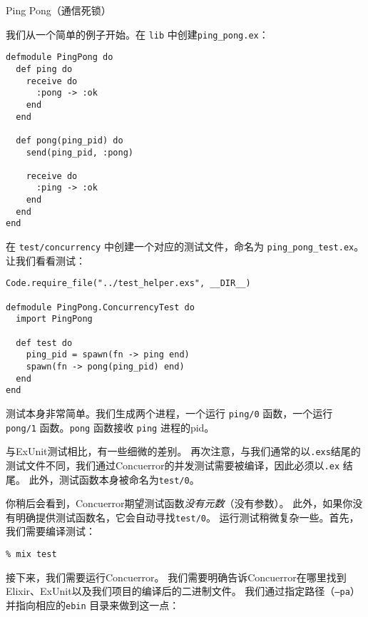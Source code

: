 \begin{example}{Ping Pong（通信死锁）}

我们从一个简单的例子开始。在 \texttt{lib} 中创建\texttt{ping\_pong.ex}：

\begin{code}{}
\begin{verbatim}
defmodule PingPong do
  def ping do
    receive do
      :pong -> :ok
    end
  end

  def pong(ping_pid) do
    send(ping_pid, :pong)

    receive do
      :ping -> :ok
    end
  end
end
\end{verbatim}
\end{code}

在 \texttt{test/concurrency}
中创建一个对应的测试文件，命名为
\texttt{ping\_pong\_test.ex}。让我们看看测试：

\begin{code}{}
\begin{verbatim}
Code.require_file("../test_helper.exs", __DIR__)

defmodule PingPong.ConcurrencyTest do
  import PingPong

  def test do
    ping_pid = spawn(fn -> ping end)
    spawn(fn -> pong(ping_pid) end)
  end
end
\end{verbatim}
\end{code}

测试本身非常简单。我们生成两个进程，一个运行
\texttt{ping/0} 函数，一个运行
\texttt{pong/1} 函数。\texttt{pong}
函数接收 \texttt{ping} 进程的pid。

与ExUnit测试相比，有一些细微的差别。
再次注意，与我们通常的以\texttt{.exs}结尾的测试文件不同，我们通过Concuerror的并发测试需要被编译，因此必须以\texttt{.ex} 结尾。
此外，测试函数本身被命名为\texttt{test/0}。

你稍后会看到，Concuerror期望测试函数\emph{没有元数}（没有参数）。
此外，如果你没有明确提供测试函数名，它会自动寻找\texttt{test/0}。
运行测试稍微复杂一些。首先，我们需要编译测试：

\begin{code}{}
\begin{verbatim}
% mix test
\end{verbatim}
\end{code}

接下来，我们需要运行Concuerror。
我们需要明确告诉Concuerror在哪里找到Elixir、ExUnit以及我们项目的编译后的二进制文件。
我们通过指定路径（\texttt{--pa}）并指向相应的\texttt{ebin} 目录来做到这一点：


\end{example}
